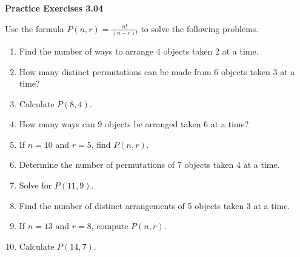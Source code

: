 \vspace{0.3ex}
\noindent\textbf{Practice Exercises 3.04}

\vspace{0.2ex}

Use the formula \(P(n, r) = \frac{n!}{(n-r)!}\) to solve the following problems.

\begin{enumerate}[label=\color{blue}\arabic*.]
    \item Find the number of ways to arrange 4 objects taken 2 at a time.
    \item How many distinct permutations can be made from 6 objects taken 3 at a time?
    \item Calculate \(P(8, 4)\).
    \item How many ways can 9 objects be arranged taken 6 at a time?
    \item If \(n = 10\) and \(r = 5\), find \(P(n, r)\).
    \item Determine the number of permutations of 7 objects taken 4 at a time.
    \item Solve for \(P(11, 9)\).
    \item Find the number of distinct arrangements of 5 objects taken 3 at a time.
    \item If \(n = 13\) and \(r = 8\), compute \(P(n, r)\).
    \item Calculate \(P(14, 7)\).
\end{enumerate}
